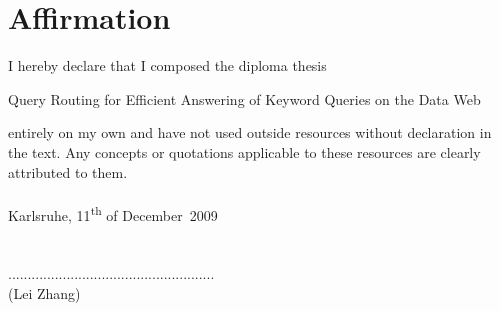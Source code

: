 \chapter*{Affirmation}
\thispagestyle{empty}

\vspace{2cm}
I hereby declare that I composed the diploma thesis \\
\begin{center}
{\large Query Routing for Efficient Answering of Keyword Queries on the Data Web}\\[0.5cm]
\end{center}

entirely on my own and have not used outside resources without declaration in the text. Any concepts or quotations applicable to these resources are clearly attributed to them.
\\
\\
Karlsruhe, 11\textsuperscript{th} of December \,2009\\
\\
\\
\hspace*{8.0cm}.....................................................\\
\hspace*{9.1cm}(Lei Zhang)
